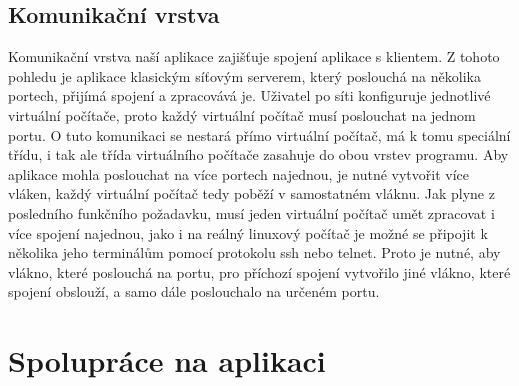 \subsection{Komunikační vrstva}
Komunikační vrstva naší aplikace zajišťuje spojení aplikace s klientem. Z tohoto pohledu je aplikace klasickým síťovým serverem, který poslouchá na několika portech, přijímá spojení a zpracovává je. Uživatel po síti konfiguruje jednotlivé virtuální počítače, proto každý virtuální počítač musí poslouchat na jednom portu. O tuto komunikaci se nestará přímo virtuální počítač, má k tomu speciální třídu, i tak ale třída virtuálního počítače zasahuje do obou vrstev programu. Aby aplikace mohla poslouchat na více portech najednou, je nutné vytvořit více vláken, každý virtuální počítač tedy poběží v samostatném vláknu. Jak plyne z posledního funkčního požadavku, musí jeden virtuální počítač umět zpracovat i více spojení najednou, jako i na reálný linuxový počítač je možné se připojit k několika jeho terminálům pomocí protokolu ssh nebo telnet. Proto je nutné, aby vlákno, které poslouchá na portu, pro příchozí spojení vytvořilo jiné vlákno, které spojení obslouží, a samo dále poslouchalo na určeném portu. 


\section{Spolupráce na aplikaci}

